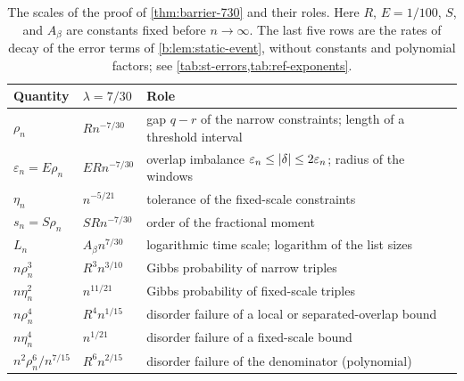 \begin{table}[!t]
\centering
\small
\caption{The scales of the proof of \cref{thm:barrier-730} and their roles.
Here $R$, $E=1/100$, $S$, and $A_\beta$ are constants fixed before $n\to\infty$. The
last five rows are the rates of decay of the error terms of
\cref{b:lem:static-event}, without constants and polynomial factors; see
\cref{tab:st-errors,tab:ref-exponents}.}\label{tab:ov-scales}
\begin{tabular}{@{}ll>{\raggedright\arraybackslash}p{}@{}}
\toprule
Quantity & $\lambda=7/30$ & Role\\
\midrule
$\rho_n$ & $Rn^{-7/30}$ & gap $q-r$ of the narrow constraints;
 length of a threshold interval\\
$\varepsilon_n=E\rho_n$ & $ERn^{-7/30}$ & overlap imbalance
 $\varepsilon_n\le\lvert \delta\rvert\le2\varepsilon_n$; radius of the windows\\
$\eta_n$ & $n^{-5/21}$ & tolerance of the fixed-scale constraints\\
$s_n=S\rho_n$ & $SRn^{-7/30}$ & order of the fractional moment\\
$L_n$ & $A_\beta n^{7/30}$ & logarithmic time scale; logarithm of
 the list sizes\\
\midrule
$n\rho_n^3$ & $R^3n^{3/10}$ & Gibbs probability of narrow triples\\
$n\eta_n^2$ & $n^{11/21}$ & Gibbs probability of fixed-scale triples\\
$n\rho_n^4$ & $R^4n^{1/15}$ & disorder failure of a local or
 separated-overlap bound\\
$n\eta_n^4$ & $n^{1/21}$ & disorder failure of a fixed-scale bound\\
$n^2\rho_n^6/n^{7/15}$ & $R^6n^{2/15}$ & disorder failure of the
 denominator (polynomial)\\
\bottomrule
\end{tabular}
\end{table}

